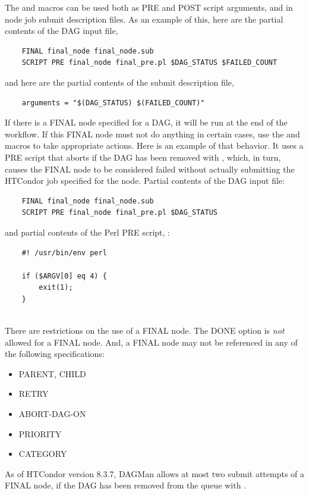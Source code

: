 The  and  macros can be used both
as PRE and POST script arguments, and in node job submit description files.
As an example of this, here are the partial contents of the DAG input file,
\begin{verbatim}
    FINAL final_node final_node.sub
    SCRIPT PRE final_node final_pre.pl $DAG_STATUS $FAILED_COUNT
\end{verbatim}

and here are the partial contents of the submit description file, 
\begin{verbatim}
    arguments = "$(DAG_STATUS) $(FAILED_COUNT)"
\end{verbatim}

If there is a FINAL node specified for a DAG, 
it will be run at the end of the workflow.
If this FINAL node must not do anything in certain cases, 
use the  and 
macros to take appropriate actions.  
Here is an example of that behavior.
It uses a PRE script that aborts if the DAG has been removed with ,
which, in turn,
causes the FINAL node to be considered failed without actually submitting the
HTCondor job specified for the node.
Partial contents of the DAG input file:
\begin{verbatim}
    FINAL final_node final_node.sub
    SCRIPT PRE final_node final_pre.pl $DAG_STATUS
\end{verbatim}

and partial contents of the Perl PRE script, :
\begin{verbatim}
    #! /usr/bin/env perl
    
    if ($ARGV[0] eq 4) {
        exit(1);
    }
   
\end{verbatim}


There are restrictions on the use of a FINAL node.
The DONE option is \emph{not} allowed for a FINAL node.
And, a FINAL node may not be referenced in any of the following
specifications:
\begin{itemize}
\item PARENT, CHILD
\item RETRY
\item ABORT-DAG-ON
\item PRIORITY
\item CATEGORY
\end{itemize}

As of HTCondor version 8.3.7, DAGMan allows at most two submit attempts
of a FINAL node,
if the DAG has been removed from the queue with .

